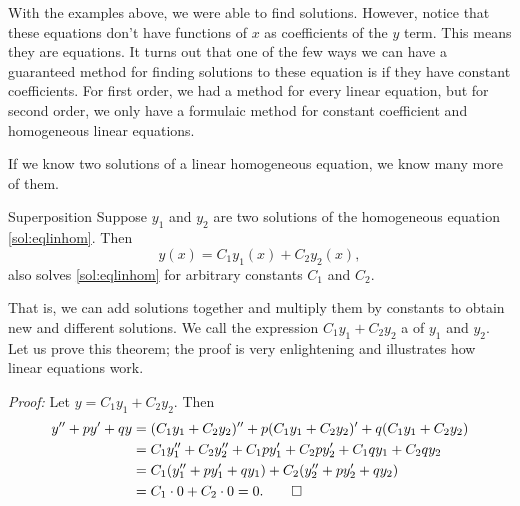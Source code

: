 \documentclass{ximera}
\begin{document}
With the examples above, we were able to find solutions. However, notice that these equations don't have functions of $x$ as coefficients of the $y$ term. This means they are  equations. It turns out that one of the few ways we can have a guaranteed method for finding solutions to these equation is if they have constant coefficients. For first order, we had a method for every linear equation, but for second order, we only have a formulaic method for constant coefficient and homogeneous linear equations. 


If we know two solutions of a linear homogeneous equation, we know many more of them.

\begin{theorem}{Superposition}
    Suppose $y_1$ and $y_2$ are two solutions of the homogeneous equation \eqref{sol:eqlinhom}.  Then 
    \begin{equation*}
        y(x) = C_1 y_1(x) + C_2 y_2(x) ,
    \end{equation*}
    also solves \eqref{sol:eqlinhom} for arbitrary constants $C_1$ and $C_2$.
\end{theorem}

That is, we can add solutions together and multiply them by constants to obtain new and different solutions.  We call the expression $C_1 y_1 + C_2 y_2$ a \emph{} of $y_1$ and $y_2$. Let us prove this theorem; the proof is very enlightening and illustrates how linear equations work.

\emph{Proof:} Let $y = C_1 y_1 + C_2 y_2$.  Then
\begin{equation*}
    \begin{split}
        y'' + py' + qy & = (C_1 y_1 + C_2 y_2)'' + p(C_1 y_1 + C_2 y_2)' + q(C_1 y_1 + C_2 y_2) \\
        & = C_1 y_1'' + C_2 y_2'' + C_1 p y_1' + C_2 p y_2' + C_1 q y_1 + C_2 q y_2 \\
        & = C_1 ( y_1'' + p y_1' + q y_1 ) + C_2 ( y_2'' + p y_2' + q y_2 ) \\
        & = C_1 \cdot 0 + C_2 \cdot 0 = 0 . \qed
    \end{split}
\end{equation*}
\end{document}
